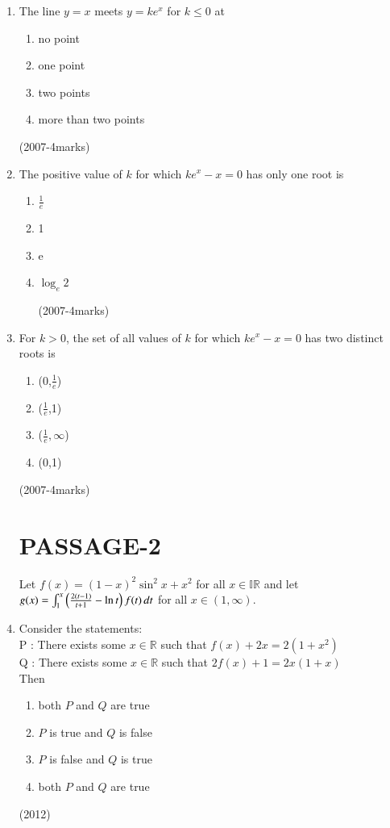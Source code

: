 \documentclass[journal,,12pt,twocolumn]{IEEEtran}
\theoremstyle{remark}
\begin{document}
\begin{enumerate}
\item The line $y=x$ meets $y=ke^x$ for $k \le 0$ at
    \begin{enumerate}[label=(\alph*)]
\item no point
\item one point
\item two points
\item more than two points
\end{enumerate}

  
\hfill {(2007-4marks)}\\


\item  The positive value of $k$ for which $ke^x-x=0$ has only one root is
\begin{enumerate}[label=(\alph*)]
\item $\frac{1}{e}$
\item 1
\item e
\item $\log_e2$
\begin{flushright}
\hfill {(2007-4marks)}
\end{flushright}
\end{enumerate}
\item For $k>0$, the set of all values of $k$ for which $ke^x-x=0$ has two distinct roots is 
\begin{enumerate}[label=(\alph*)]
\item (0,$\frac{1}{e}$)
\item ($\frac{1}{e}$,1)
\item ($\frac{1}{e},\infty$)
\item (0,1)
\end{enumerate}
\begin{flushright}
\hfill {(2007-4marks)}
\end{flushright}

\section*{PASSAGE-2}
Let $f(x)=(1-x)^2 \sin^2 x + x^2$ for all $x \in \mathbb{IR}$ and let $g(x)=
\int_{1}^{x} \left(\frac{2(t-1)}{t+1} - \ln t\right)  f(t) \, dt $ for all $x \in (1 ,\infty)$.
\item Consider the statements:\\
P : There exists some $x \in \mathbb{R}$ such that $f(x) + 2x = 2(1+x^2)$\\
Q : There exists some $x \in\mathbb{R}$ such that $2f(x) + 1 = 2x(1+x)$\\
    Then
\begin{enumerate}[label=(\alph*)]
\item both $P$ and $Q$ are true
\item $P$ is true and $Q$ is false
\item $P$ is false and $Q$ is true
\item both $P$ and $Q$ are true
\end{enumerate}
\begin{flushright}
\hfill{(2012)}
\end{flushright}



\end{enumerate}
\end{document}
